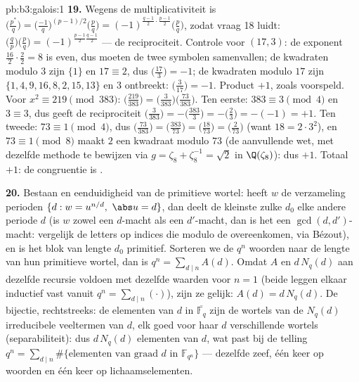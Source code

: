 \begin{solution}{pb:b3:galois:1}
\textbf{19.} Wegens de multiplicativiteit is
$\bigl(\frac{p^*}q\bigr) =
\bigl(\frac{-1}q\bigr)^{(p-1)/2}\bigl(\frac pq\bigr) =
(-1)^{\frac{q-1}2\cdot\frac{p-1}2}\bigl(\frac pq\bigr)$, zodat
vraag 18 luidt: $\bigl(\frac qp\bigr)\bigl(\frac pq\bigr) =
(-1)^{\frac{p-1}2\frac{q-1}2}$ --- de reciprociteit. Controle voor
$(17, 3)$: de exponent $\frac{16}2\cdot\frac22 = 8$ is even, dus
moeten de twee symbolen samenvallen; de kwadraten modulo $3$ zijn
$\{1\}$ en $17 \equiv 2$, dus $\bigl(\frac{17}3\bigr) = -1$; de
kwadraten modulo $17$ zijn $\{1, 4, 9, 16, 8, 2, 15, 13\}$ en $3$
ontbreekt: $\bigl(\frac3{17}\bigr) = -1$. Product $+1$, zoals
voorspeld. Voor $x^2 \equiv 219 \pmod{383}$:
$\bigl(\frac{219}{383}\bigr) =
\bigl(\frac3{383}\bigr)\bigl(\frac{73}{383}\bigr)$. Ten eerste:
$383 \equiv 3 \pmod4$ en $3 \equiv 3$, dus geeft de reciprociteit
$\bigl(\frac3{383}\bigr) = -\bigl(\frac{383}3\bigr) =
-\bigl(\frac23\bigr) = -(-1) = +1$. Ten tweede: $73 \equiv 1 \pmod
4$, dus $\bigl(\frac{73}{383}\bigr) = \bigl(\frac{383}{73}\bigr) =
\bigl(\frac{18}{73}\bigr) = \bigl(\frac2{73}\bigr)$ (want $18 =
2\cdot3^2$), en $73 \equiv 1 \pmod 8$ maakt $2$ een kwadraat
modulo $73$ (de aanvullende wet, met dezelfde methode te bewijzen
via $g = \zeta_8 + \zeta_8^{-1} = \sqrt2$ in $\Q(\zeta_8)$): dus
$+1$. Totaal $+1$: de congruentie is .

\textbf{20.} Bestaan en eenduidigheid van de primitieve wortel:
heeft $w$ de verzameling perioden $\{d : w = u^{n/d},\ \abs u =
d\}$, dan deelt de kleinste zulke $d_0$ elke andere periode $d$
(is $w$ zowel een $d$-macht als een $d'$-macht, dan is het een
$\gcd(d, d')$-macht: vergelijk de letters op indices die modulo de
 overeenkomen, via Bézout), en is het blok
van lengte $d_0$ primitief. Sorteren we de $q^n$ woorden naar de
lengte van hun primitieve wortel, dan is $q^n = \sum_{d \mid
n}A(d)$. Omdat $A$ en $d\,N_q(d)$ aan dezelfde recursie voldoen
met dezelfde waarden voor $n = 1$ (beide leggen elkaar inductief
vast vanuit $q^n = \sum_{d\mid n}(\cdot)$), zijn ze gelijk: $A(d)
= d\,N_q(d)$. De bijectie, rechtstreeks: de elementen van 
$d$ in $\overline{\mathbb F_q}$ zijn de wortels van de $N_q(d)$
irreducibele veeltermen van  $d$, elk goed voor haar $d$
verschillende wortels (separabiliteit): dus $d\,N_q(d)$ elementen
van  $d$, wat past bij de telling $q^n = \sum_{d\mid n}\#\{
\text{elementen van graad } d \text{ in } \mathbb F_{q^n}\}$ ---
dezelfde zeef, één keer op woorden en één keer op
lichaamselementen.


\end{solution}
